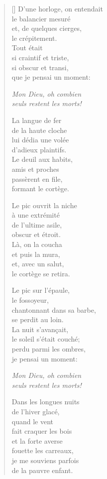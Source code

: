 \documentclass[a4paper,12pt]{book}
\begin{document}
\begin{verse}[\versewidth]
  D'une horloge, on entendait \\
  le balancier mesuré \\
  et, de quelques cierges, \\
  le crépitement. \\
  Tout était \\
  si craintif et triste, \\
  si obscur et transi, \\
  que je pensai un moment:

  \emph{Mon Dieu, oh combien \\
  seuls restent les morts!}

  La langue de fer \\
  de la haute cloche \\
  lui dédia une volée \\
  d'adieux plaintifs. \\
  Le deuil aux habits, \\
  amis et proches \\
  passèrent en file, \\
  formant le cortège.

  Le pic ouvrit la niche \\
  à une extrémité \\
  de l'ultime asile, \\
  obscur et étroit. \\
  Là, on la coucha \\
  et puis la mura, \\
  et, avec un salut, \\
  le cortège se retira.

  Le pic sur l'épaule, \\
  le fossoyeur, \\
  chantonnant dans sa barbe, \\
  se perdit au loin. \\
  La nuit s'avançait, \\
  le soleil s'était couché; \\
  perdu parmi les ombres, \\
  je pensai un moment:

  \emph{Mon Dieu, oh combien \\
  seuls restent les morts!}

  Dans les longues nuits \\
  de l'hiver glacé, \\
  quand le vent \\
  fait craquer les bois \\
  et la forte averse \\
  fouette les carreaux, \\
  je me souviens parfois \\
  de la pauvre enfant.


\end{verse}
\end{document}
